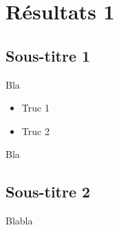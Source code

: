 
\section{Résultats 1}

	\subsection{Sous-titre 1}

	Bla

	\begin{itemize}
		\item Truc 1
		\item Truc 2
	\end{itemize}

	Bla

	\subsection{Sous-titre 2}

		Blabla